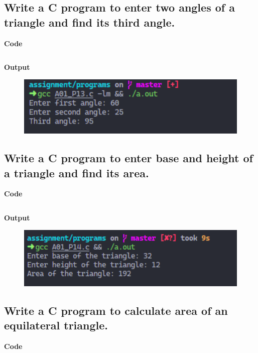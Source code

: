 \documentclass[a4paper]{article}
\begin{document}
\newpage



\subsection{Write a C program to enter two angles of a triangle and find its third angle.}
\textbf{Code}

\inputminted{C}{programs/A01_P13.c}

\textbf{Output}

\begin{figure}[h]
  \includegraphics[width=12cm]{A01_P13}
\end{figure}

\newpage



\subsection{Write a C program to enter base and height of a triangle and find its area.}
\textbf{Code}

\inputminted{C}{programs/A01_P14.c}

\textbf{Output}

\begin{figure}[h]
  \includegraphics[width=12cm]{A01_P14}
\end{figure}

\newpage



\subsection{Write a C program to calculate area of an equilateral triangle.}
\textbf{Code}
\end{document}
